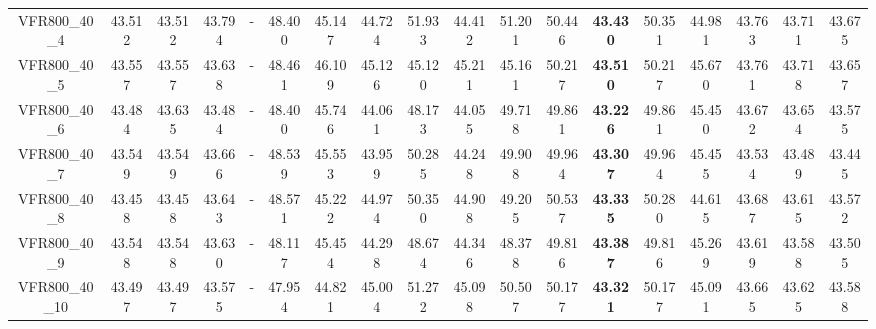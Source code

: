 \begin{tabular}{cc|ccc|ccccccccccccc}
VFR800\_40\_4      & 43.512           & 43.512           & 43.794           & -                & 48.400           & 45.147           & 44.724           & 51.933           & 44.412           & 51.201           & 50.446           & {\bf 43.430}     & 50.351           & 44.981           & 43.763           & 43.711           & 43.675          \\ 
VFR800\_40\_5      & 43.557           & 43.557           & 43.638           & -                & 48.461           & 46.109           & 45.126           & 45.120           & 45.211           & 45.161           & 50.217           & {\bf 43.510}     & 50.217           & 45.670           & 43.761           & 43.718           & 43.657          \\ 
VFR800\_40\_6      & 43.484           & 43.635           & 43.484           & -                & 48.400           & 45.746           & 44.061           & 48.173           & 44.055           & 49.718           & 49.861           & {\bf 43.226}     & 49.861           & 45.450           & 43.672           & 43.654           & 43.575          \\ 
VFR800\_40\_7      & 43.549           & 43.549           & 43.666           & -                & 48.539           & 45.553           & 43.959           & 50.285           & 44.248           & 49.908           & 49.964           & {\bf 43.307}     & 49.964           & 45.455           & 43.534           & 43.489           & 43.445          \\ 
VFR800\_40\_8      & 43.458           & 43.458           & 43.643           & -                & 48.571           & 45.222           & 44.974           & 50.350           & 44.908           & 49.205           & 50.537           & {\bf 43.335}     & 50.280           & 44.615           & 43.687           & 43.615           & 43.572          \\ 
VFR800\_40\_9      & 43.548           & 43.548           & 43.630           & -                & 48.117           & 45.454           & 44.298           & 48.674           & 44.346           & 48.378           & 49.816           & {\bf 43.387}     & 49.816           & 45.269           & 43.619           & 43.588           & 43.505          \\ 
VFR800\_40\_10     & 43.497           & 43.497           & 43.575           & -                & 47.954           & 44.821           & 45.004           & 51.272           & 45.098           & 50.507           & 50.177           & {\bf 43.321}     & 50.177           & 45.091           & 43.665           & 43.625           & 43.588          \\ 

\end{tabular}
